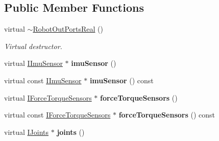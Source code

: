 \subsection*{Public Member Functions}
\begin{DoxyCompactItemize}
\item 
virtual \hyperlink{classow__core_1_1RobotOutPortsReal_a39f2fa114f429a749eb51dc52216552f}{$\sim$\+Robot\+Out\+Ports\+Real} ()\hypertarget{classow__core_1_1RobotOutPortsReal_a39f2fa114f429a749eb51dc52216552f}{}\label{classow__core_1_1RobotOutPortsReal_a39f2fa114f429a749eb51dc52216552f}

\begin{DoxyCompactList}\small\item\em Virtual destructor. \end{DoxyCompactList}\item 
virtual \hyperlink{classow__core_1_1IImuSensor}{I\+Imu\+Sensor} $\ast$ {\bfseries imu\+Sensor} ()\hypertarget{classow__core_1_1RobotOutPortsReal_afff66144f7d22f7c649713d5e60cd1c5}{}\label{classow__core_1_1RobotOutPortsReal_afff66144f7d22f7c649713d5e60cd1c5}

\item 
virtual const \hyperlink{classow__core_1_1IImuSensor}{I\+Imu\+Sensor} $\ast$ {\bfseries imu\+Sensor} () const \hypertarget{classow__core_1_1RobotOutPortsReal_a22f44cd9c847612acaacfc7396dff64b}{}\label{classow__core_1_1RobotOutPortsReal_a22f44cd9c847612acaacfc7396dff64b}

\item 
virtual \hyperlink{classow__core_1_1IForceTorqueSensors}{I\+Force\+Torque\+Sensors} $\ast$ {\bfseries force\+Torque\+Sensors} ()\hypertarget{classow__core_1_1RobotOutPortsReal_a5f4efdea4e27e18a0fc07a733a472372}{}\label{classow__core_1_1RobotOutPortsReal_a5f4efdea4e27e18a0fc07a733a472372}

\item 
virtual const \hyperlink{classow__core_1_1IForceTorqueSensors}{I\+Force\+Torque\+Sensors} $\ast$ {\bfseries force\+Torque\+Sensors} () const \hypertarget{classow__core_1_1RobotOutPortsReal_a48544ac0f33960465363fb8eb3bbb0c9}{}\label{classow__core_1_1RobotOutPortsReal_a48544ac0f33960465363fb8eb3bbb0c9}

\item 
virtual \hyperlink{classow__core_1_1IJoints}{I\+Joints} $\ast$ {\bfseries joints} ()\hypertarget{classow__core_1_1RobotOutPortsReal_aaed7004404fb7b926e9dffa5d097659f}{}\label{classow__core_1_1RobotOutPortsReal_aaed7004404fb7b926e9dffa5d097659f}


\end{DoxyCompactItemize}
